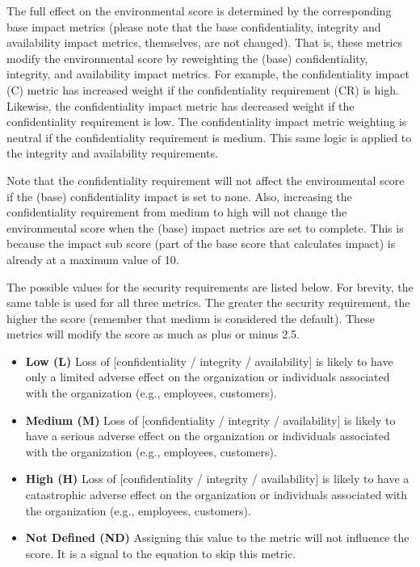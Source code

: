         The full effect on the environmental score is determined by the
        corresponding base impact metrics (please note that the base
        confidentiality, integrity and availability impact metrics, themselves,
        are not changed). That is, these metrics modify the environmental score
        by reweighting the (base) confidentiality, integrity, and availability
        impact metrics. For example, the confidentiality impact (C) metric has
        increased weight if the confidentiality requirement (CR) is high.
        Likewise, the confidentiality impact metric has decreased weight if the
        confidentiality requirement is low. The confidentiality impact metric
        weighting is neutral if the confidentiality requirement is medium. This
        same logic is applied to the integrity and availability requirements.

        Note that the confidentiality requirement will not affect the
        environmental score if the (base) confidentiality impact is set to none.
        Also, increasing the confidentiality requirement from medium to high
        will not change the environmental score when the (base) impact metrics
        are set to complete. This is because the impact sub score (part of the
        base score that calculates impact) is already at a maximum value of 10.

        The possible values for the security requirements are listed below. For
        brevity, the same table is used for all three metrics. The greater the
        security requirement, the higher the score (remember that medium is
        considered the default). These metrics will modify the score as much as
        plus or minus 2.5.

        \begin{itemize}
          \item
            \textbf{Low (L)} Loss of {[}confidentiality / integrity /
            availability{]} is likely to have only a limited adverse effect on the
            organization or individuals associated with the organization (e.g.,
            employees, customers).
          \item
            \textbf{Medium (M)} Loss of {[}confidentiality / integrity /
            availability{]} is likely to have a serious adverse effect on the
            organization or individuals associated with the organization (e.g.,
            employees, customers).
          \item
            \textbf{High (H)} Loss of {[}confidentiality / integrity /
            availability{]} is likely to have a catastrophic adverse effect on the
            organization or individuals associated with the organization (e.g.,
            employees, customers).
          \item
            \textbf{Not Defined (ND)} Assigning this value to the metric will not
            influence the score. It is a signal to the equation to skip this
            metric.
        \end{itemize}

